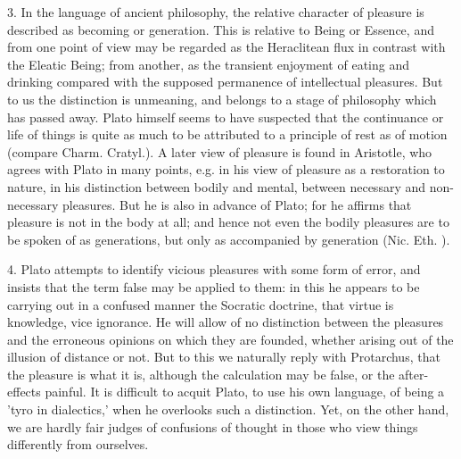 \documentclass[11pt,letter]{article}
\begin{document}
\par  3. In the language of ancient philosophy, the relative character of pleasure is described as becoming or generation. This is relative to Being or Essence, and from one point of view may be regarded as the Heraclitean flux in contrast with the Eleatic Being; from another, as the transient enjoyment of eating and drinking compared with the supposed permanence of intellectual pleasures. But to us the distinction is unmeaning, and belongs to a stage of philosophy which has passed away. Plato himself seems to have suspected that the continuance or life of things is quite as much to be attributed to a principle of rest as of motion (compare Charm. Cratyl.). A later view of pleasure is found in Aristotle, who agrees with Plato in many points, e.g. in his view of pleasure as a restoration to nature, in his distinction between bodily and mental, between necessary and non-necessary pleasures. But he is also in advance of Plato; for he affirms that pleasure is not in the body at all; and hence not even the bodily pleasures are to be spoken of as generations, but only as accompanied by generation (Nic. Eth. ).

\par  4. Plato attempts to identify vicious pleasures with some form of error, and insists that the term false may be applied to them: in this he appears to be carrying out in a confused manner the Socratic doctrine, that virtue is knowledge, vice ignorance. He will allow of no distinction between the pleasures and the erroneous opinions on which they are founded, whether arising out of the illusion of distance or not. But to this we naturally reply with Protarchus, that the pleasure is what it is, although the calculation may be false, or the after-effects painful. It is difficult to acquit Plato, to use his own language, of being a 'tyro in dialectics,' when he overlooks such a distinction. Yet, on the other hand, we are hardly fair judges of confusions of thought in those who view things differently from ourselves.
\end{document}
